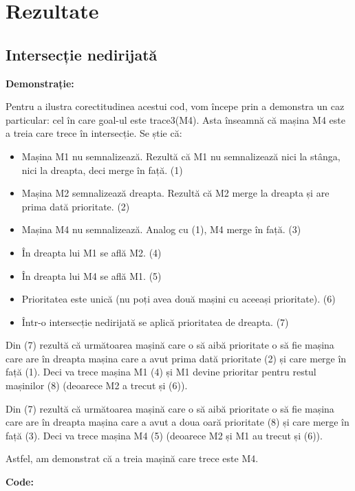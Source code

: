  \section{Rezultate}
 
 \subsection{Intersecție nedirijată}
 \textbf{Demonstrație:}
 
 Pentru a ilustra corectitudinea acestui cod, vom începe prin a demonstra un caz particular: cel în care goal-ul este trace3(M4). Asta înseamnă că mașina M4 este a treia care trece în intersecție.
 	Se știe că:
 	
 	 \begin{itemize}
    \setlength\itemsep{0em}
    \item Mașina M1 nu semnalizează. Rezultă că M1 nu semnalizează nici la stânga, nici la dreapta, deci merge în față.  (1)
    \item Mașina M2 semnalizează dreapta. Rezultă că M2 merge la dreapta și are prima dată prioritate. (2)
    \item Mașina M4 nu semnalizează. Analog cu (1), M4 merge în față. (3)
    \item În dreapta lui M1 se află M2. (4)
    \item În dreapta lui M4 se află M1. (5)
    \item Prioritatea este unică (nu poți avea două mașini cu aceeași prioritate). (6)
    \item Într-o intersecție nedirijată se aplică prioritatea de dreapta. (7)
\end{itemize}

Din (7) rezultă că următoarea mașină care o să aibă prioritate o să fie mașina care are în dreapta mașina care a avut prima dată prioritate (2) și care merge în față (1). Deci va trece mașina M1 (4) și M1 devine prioritar pentru restul mașinilor (8) (deoarece M2 a trecut și (6)).

Din (7) rezultă că următoarea mașină care o să aibă prioritate o să fie mașina care are în dreapta mașina care a avut a doua oară prioritate (8) și care merge în față (3). Deci va trece mașina M4 (5) (deoarece M2 și M1 au trecut și (6)).

	Astfel, am demonstrat că a treia mașină care trece este M4.
	
	
\textbf{Code:}

    \inputminted[linenos]{C}{cod/aut.out}	

